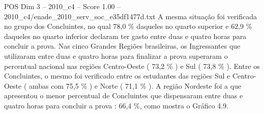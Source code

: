 \begin{textsample}{POS Dim 3 – 2010\_c4 – Score 1.00 – 2010\_c4/enade\_2010\_serv\_soc\_e35df1477d.txt}
A mesma situação foi verificada no grupo dos Concluintes, no qual 78,0 \% daqueles no quarto superior e 62,9 \% daqueles no quarto inferior declaram ter gasto entre duas e quatro horas para concluir a prova.
Nas cinco Grandes Regiões brasileiras, os Ingressantes que utilizaram entre duas e quatro horas para finalizar a prova superaram o percentual nacional nas regiões Centro-Oeste ( 73,2 \% ) e Sul ( 73,8 \% ).
Entre os Concluintes, o mesmo foi verificado entre os estudantes das regiões Sul e Centro-Oeste ( ambas com 75,5 \% ) e Norte ( 71,1 \% ).
A região Nordeste foi a que apresentou o menor percentual de Concluintes que dispensaram entre duas e quatro horas para concluir a prova : 66,4 \%, como mostra o Gráfico 4.9.

\end{textsample}
